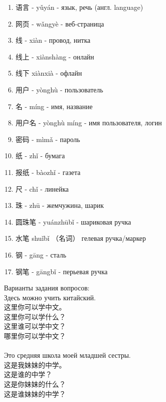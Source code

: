 \begin{newwords}
\begin{enumerate}
	\item 语言 - yǔyán - язык, речь (англ. language)
	\item 网页 - wǎngyè - веб-страница
	\item 线 - xiàn - провод, нитка
	\item 线上 - xiànshàng - онлайн
	\item 线下 xiànxià - офлайн
	\item 用户 - yònghù - пользователь
	\item 名 - míng - имя, название
	\item 用户名 - yònghù míng - имя пользователя, логин
	\item 密码 - mìmǎ - пароль 
	\item 纸 - zhǐ - бумага
	\item 报纸 - bàozhǐ - газета
	\item 尺 - chǐ - линейка
	\item 珠 - zhū - жемчужина, шарик
	\item 圆珠笔 - yuánzhūbǐ - шариковая ручка
	\item 水笔 shuǐbǐ （名词） гелевая ручка/маркер
	\item 钢 - gāng - сталь
	\item 钢笔 - gāngbǐ - перьевая ручка
	\end{enumerate}
\end{newwords}
Варианты задания вопросов:\\
Здесь можно учить китайский.\\
这里你可以学中文。\\
这里你可以学什么？\\
这里谁可以学中文？\\
哪里你可以学中文？\\
\\
Это средняя школа моей младшей сестры.\\
这是我妹妹的中学。\\
这是谁的中学？\\
这是你妹妹的什么？\\
这是谁妹妹的中学？\\
